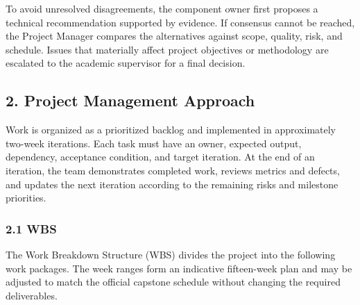\documentclass[11pt,a4paper]{article}
\begin{document}
To avoid unresolved disagreements, the component owner first proposes a
technical recommendation supported by evidence. If consensus cannot be reached,
the Project Manager compares the alternatives against scope, quality, risk, and
schedule. Issues that materially affect project objectives or methodology are
escalated to the academic supervisor for a final decision.

\subsection{2. Project Management Approach}

Work is organized as a prioritized backlog and implemented in approximately
two-week iterations. Each task must have an owner, expected output, dependency,
acceptance condition, and target iteration. At the end of an iteration, the
team demonstrates completed work, reviews metrics and defects, and updates the
next iteration according to the remaining risks and milestone priorities.

\subsubsection{2.1 WBS}

The Work Breakdown Structure (WBS) divides the project into the following work
packages. The week ranges form an indicative fifteen-week plan and may be
adjusted to match the official capstone schedule without changing the required
deliverables.
\end{document}
